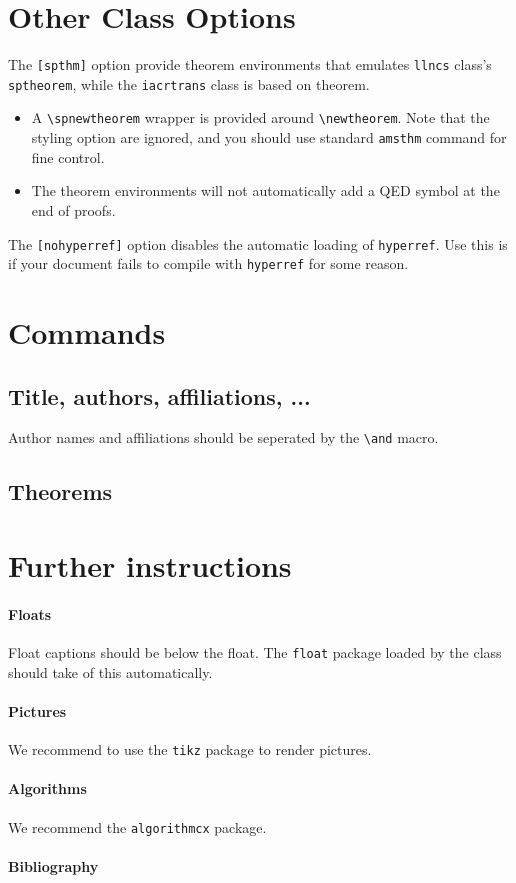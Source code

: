 \documentclass[preprint]{iacrtrans}
\begin{document}
\section{Other Class Options}

The \texttt{[spthm]} option provide theorem environments that emulates
\texttt{llncs} class's \texttt{sptheorem}, while the
\texttt{iacrtrans} class is based on \AmS{} theorem.
\begin{itemize}
\item A \texttt{\textbackslash{}spnewtheorem} wrapper is provided
  around \AmS{} \texttt{\textbackslash{}newtheorem}.  Note that the
  styling option are ignored, and you should use standard
  \texttt{amsthm} command for fine control.
\item The \AmS{} theorem environments will not automatically add a
  QED symbol at the end of proofs.
\end{itemize}

The \texttt{[nohyperref]} option disables the automatic loading of
\texttt{hyperref}.  Use this is if your document fails to compile with
\texttt{hyperref} for some reason.

\section{Commands}

\subsection{Title, authors, affiliations, ...}

Author names and affiliations should be seperated by the
\texttt{\textbackslash{}and} macro.




\subsection{Theorems}




\section{Further instructions}

\paragraph{Floats}

Float captions should be below the float.  The \texttt{float} package
loaded by the class should take of this automatically.

\paragraph{Pictures}

We recommend to use the \texttt{tikz} package to render pictures.

\paragraph{Algorithms}

We recommend the \texttt{algorithmcx} package.

\paragraph{Bibliography}
\end{document}
